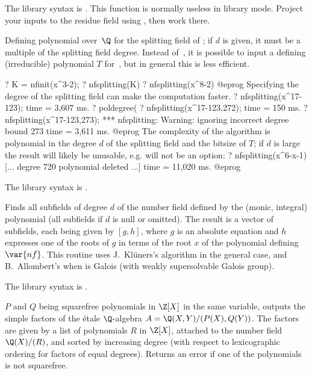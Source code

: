 The library syntax is .
This function is normally useless in library mode. Project your
inputs to the residue field using , then work there.

\label{se:nfsplitting}
Defining polynomial over~$\Q$ for the splitting field of ;
if $d$ is given, it must be a multiple of the splitting field degree.
Instead of~, it is possible to input a defining (irreducible)
polynomial $T$ for~, but in general this is less efficient.

\bprog
? K = nfinit(x^3-2);
? nfsplitting(K)
?  nfsplitting(x^8-2)
@eprog
\noindent
Specifying the degree of the splitting field can make the computation faster.
\bprog
? nfsplitting(x^17-123);
time = 3,607 ms.
? poldegree(%
? nfsplitting(x^17-123,272);
time = 150 ms.
? nfsplitting(x^17-123,273);
 *** nfsplitting: Warning: ignoring incorrect degree bound 273
time = 3,611 ms.
@eprog
\noindent
The complexity of the algorithm is polynomial in the degree $d$ of the
splitting field and the bitsize of $T$; if $d$ is large the result will
likely be unusable, e.g.  will not be an option:
\bprog
? nfsplitting(x^6-x-1)
[... degree 720 polynomial deleted ...]
time = 11,020 ms.
@eprog

The library syntax is .

\label{se:nfsubfields}
Finds all subfields of degree
$d$ of the number field defined by the (monic, integral) polynomial
 (all subfields if $d$ is null or omitted). The result is a vector
of subfields, each being given by $[g,h]$, where $g$ is an absolute equation
and $h$ expresses one of the roots of $g$ in terms of the root $x$ of the
polynomial defining $\var{nf}$. This routine uses J.~Kl\"uners's algorithm
in the general case, and B.~Allombert's  when 
is Galois (with weakly supersolvable Galois group).

The library syntax is .

\label{se:polcompositum}
 $P$ and $Q$
being squarefree polynomials in $\Z[X]$ in the same variable, outputs
the simple factors of the \'etale $\Q$-algebra $A = \Q(X, Y) / (P(X), Q(Y))$.
The factors are given by a list of polynomials $R$ in $\Z[X]$, attached to
the number field $\Q(X)/ (R)$, and sorted by increasing degree (with respect
to lexicographic ordering for factors of equal degrees). Returns an error if
one of the polynomials is not squarefree.


